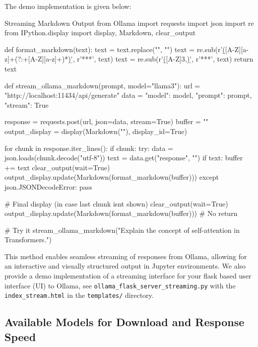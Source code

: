 The demo implementation is given below:

\begin{codeonly}{Streaming Markdown Output from Ollama}
import requests
import json
import re
from IPython.display import display, Markdown, clear_output

def format_markdown(text):
    text = text.replace("\n", "\n\n")
    text = re.sub(r'\b([A-Z][a-z]+(?:\s+[A-Z][a-z]+)*)\b', r'**\1**', text)
    text = re.sub(r'\b([A-Z]{3,})\b', r'**\1**', text)
    return text

def stream_ollama_markdown(prompt, model="llama3"):
    url = "http://localhost:11434/api/generate"
    data = {"model": model, "prompt": prompt, "stream": True}

    response = requests.post(url, json=data, stream=True)
    buffer = ""
    output_display = display(Markdown(""), display_id=True)

    for chunk in response.iter_lines():
        if chunk:
            try:
                data = json.loads(chunk.decode("utf-8"))
                text = data.get("response", "")
                if text:
                    buffer += text
                    clear_output(wait=True)
                    output_display.update(Markdown(format_markdown(buffer)))
            except json.JSONDecodeError:
                pass

    # Final display (in case last chunk isnt shown)
    clear_output(wait=True)
    output_display.update(Markdown(format_markdown(buffer)))
    # No return


# Try it
stream_ollama_markdown("Explain the concept of self-attention in Transformers.")

\end{codeonly}

This method enables seamless streaming of responses from Ollama, allowing for an interactive and visually structured output in Jupyter environments.
We also provide a demo implementation of a streaming interface for your flask based user interface (UI) to Ollama, see \texttt{ollama\_flask\_server\_streaming.py} with the \texttt{index\_stream.html} in the \texttt{templates/} directory. 



\subsection{Available Models for Download and Response Speed}

